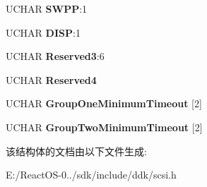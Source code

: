 \begin{DoxyCompactItemize}
U\+C\+H\+AR {\bfseries S\+W\+PP}\+:1
\item 
\mbox{\label{struct___c_d_v_d___i_n_a_c_t_i_v_i_t_y___t_i_m_e_o_u_t___p_a_g_e_a8604a1bd326c1b90bcbcc657986931ee}} 
U\+C\+H\+AR {\bfseries D\+I\+SP}\+:1
\item 
\mbox{\label{struct___c_d_v_d___i_n_a_c_t_i_v_i_t_y___t_i_m_e_o_u_t___p_a_g_e_af2e014e320bca3f5950cd0f1e251c054}} 
U\+C\+H\+AR {\bfseries Reserved3}\+:6
\item 
\mbox{\label{struct___c_d_v_d___i_n_a_c_t_i_v_i_t_y___t_i_m_e_o_u_t___p_a_g_e_aa22a1a0e5928978ba2abd51783133a37}} 
U\+C\+H\+AR {\bfseries Reserved4}
\item 
\mbox{\label{struct___c_d_v_d___i_n_a_c_t_i_v_i_t_y___t_i_m_e_o_u_t___p_a_g_e_a3a86c6a9c57b6ee83bca8ad458c8ba05}} 
U\+C\+H\+AR {\bfseries Group\+One\+Minimum\+Timeout} \mbox{[}2\mbox{]}
\item 
\mbox{\label{struct___c_d_v_d___i_n_a_c_t_i_v_i_t_y___t_i_m_e_o_u_t___p_a_g_e_a0a18b4809033226e438b8bdcef26f9a8}} 
U\+C\+H\+AR {\bfseries Group\+Two\+Minimum\+Timeout} \mbox{[}2\mbox{]}
\end{DoxyCompactItemize}


该结构体的文档由以下文件生成\+:\begin{DoxyCompactItemize}
\item 
E\+:/\+React\+O\+S-\/0../sdk/include/ddk/scsi.\+h\end{DoxyCompactItemize}
